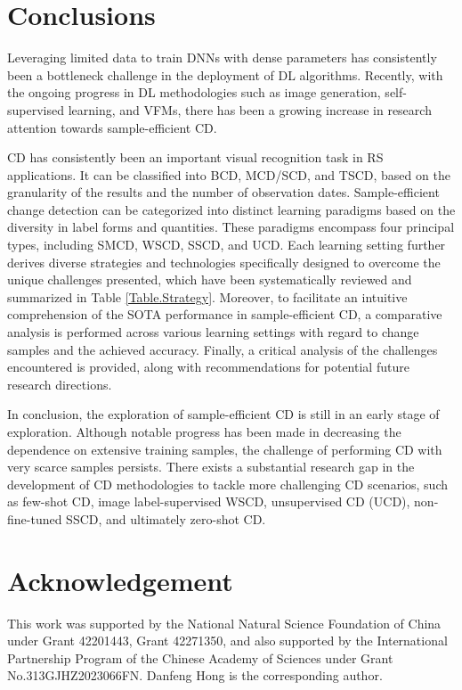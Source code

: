 \section{Conclusions}

Leveraging limited data to train DNNs with dense parameters has consistently been a bottleneck challenge in the deployment of DL algorithms. Recently, with the ongoing progress in DL methodologies such as image generation, self-supervised learning, and VFMs, there has been a growing increase in research attention towards sample-efficient CD.

CD has consistently been an important visual recognition task in RS applications. It can be classified into BCD, MCD/SCD, and TSCD, based on the granularity of the results and the number of observation dates. Sample-efficient change detection can be categorized into distinct learning paradigms based on the diversity in label forms and quantities. These paradigms encompass four principal types, including SMCD, WSCD, SSCD, and UCD. Each learning setting further derives diverse strategies and technologies specifically designed to overcome the unique challenges presented, which have been systematically reviewed and summarized in Table \ref{Table.Strategy}. Moreover, to facilitate an intuitive comprehension of the SOTA performance in sample-efficient CD, a comparative analysis is performed across various learning settings with regard to change samples and the achieved accuracy. Finally, a critical analysis of the challenges encountered is provided, along with recommendations for potential future research directions.

In conclusion, the exploration of sample-efficient CD is still in an early stage of exploration. Although notable progress has been made in decreasing the dependence on extensive training samples, the challenge of performing CD with very scarce samples persists. There exists a substantial research gap in the development of CD methodologies to tackle more challenging CD scenarios, such as few-shot CD, image label-supervised WSCD, unsupervised CD (UCD), non-fine-tuned SSCD, and ultimately zero-shot CD.

\section*{Acknowledgement}
This work was supported by the National Natural Science Foundation of China under Grant 42201443, Grant 42271350, and also supported by the International Partnership Program of the Chinese Academy of Sciences under Grant No.313GJHZ2023066FN. Danfeng Hong is the corresponding author.
